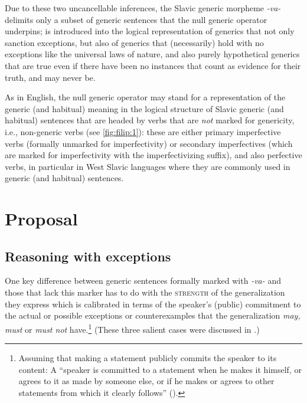 \documentclass[output=paper,colorlinks,citecolor=brown]{langscibook}
\begin{document}
Due to these two uncancellable inferences, the Slavic
generic morpheme \textit{-va-} delimits only a subset of generic sentences that the null generic
operator  underpins;  is introduced into the
logical representation of generics that not only sanction exceptions, but also of generics that (necessarily) hold with no exceptions like the universal laws of nature,
and also purely hypothetical generics that are true even if there have been no instances that count as
evidence for their truth, and may never be.

As in English, the null generic operator 
may stand for a representation of the generic (and habitual)
meaning
in the logical structure of
Slavic generic (and habitual) sentences that are headed by verbs
that are \textit{not} marked for genericity, i.e.,
non-generic verbs (see \ref{fig:filip:1}):
these are either
primary imperfective verbs (formally unmarked for imperfectivity) or secondary imperfectives (which
are marked for imperfectivity with
the imperfectivizing suffix), and also perfective verbs, in particular in West Slavic languages where they are commonly used in generic (and habitual) sentences.



\section{Proposal} \label{proposal}

\subsection{Reasoning with exceptions}\label{proposal5.1}

One key difference between generic sentences formally marked with \textit{-va-} and those that lack this marker has to do with the \textsc{strength} of the generalization they express which is calibrated in terms of the speaker's (public) commitment to the actual or possible exceptions or counterexamples that the generalization \textit{may, must} or \textit{must not} have.\footnote{Assuming that making a statement publicly commits the speaker to its content: A ``speaker is committed to a statement when he makes it himself, or agrees to it as made by someone else, or if he makes or agrees to other statements from which it clearly follows” (\citealt[136]{hamblin1971mathematical,hamblin1987}).}
(These three salient cases were discussed in .)
\end{document}
